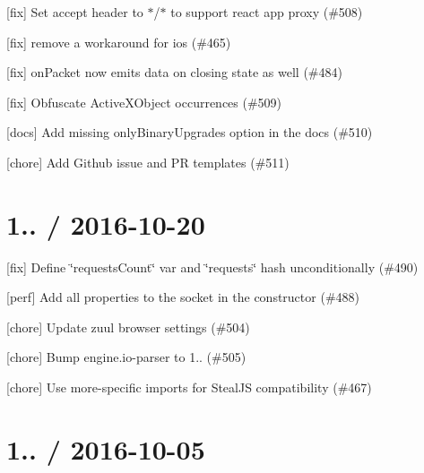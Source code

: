 \begin{DoxyItemize}
\item \mbox{[}fix\mbox{]} Set accept header to $\ast$/$\ast$ to support react app proxy (\#508)
\item \mbox{[}fix\mbox{]} remove a workaround for ios (\#465)
\item \mbox{[}fix\mbox{]} on\+Packet now emits data on \textquotesingle{}closing\textquotesingle{} state as well (\#484)
\item \mbox{[}fix\mbox{]} Obfuscate {\ttfamily Active\+X\+Object} occurrences (\#509)
\item \mbox{[}docs\mbox{]} Add missing {\ttfamily only\+Binary\+Upgrades} option in the docs (\#510)
\item \mbox{[}chore\mbox{]} Add Github issue and PR templates (\#511)
\end{DoxyItemize}

\section*{1.. / 2016-\/10-\/20 }


\begin{DoxyItemize}
\item \mbox{[}fix\mbox{]} Define \char`\"{}requests\+Count\char`\"{} var and \char`\"{}requests\char`\"{} hash unconditionally (\#490)
\item \mbox{[}perf\mbox{]} Add all properties to the socket in the constructor (\#488)
\item \mbox{[}chore\mbox{]} Update zuul browser settings (\#504)
\item \mbox{[}chore\mbox{]} Bump engine.\+io-\/parser to 1.. (\#505)
\item \mbox{[}chore\mbox{]} Use more-\/specific imports for Steal\+JS compatibility (\#467)
\end{DoxyItemize}

\section*{1.. / 2016-\/10-\/05 }


